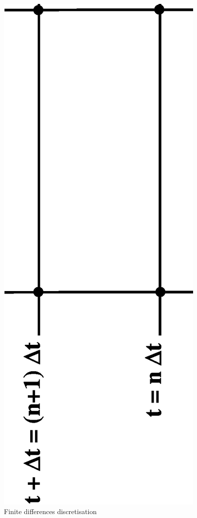 \begin{figure}
 \begin{center}
  \includegraphics[scale=0.5,angle=270]{Figures/Disc_DF.eps} \hspace{2cm}
  \vspace{1cm}
  \caption{Finite differences discretisation}
  \label{DF}
 \end{center}
\end{figure}

